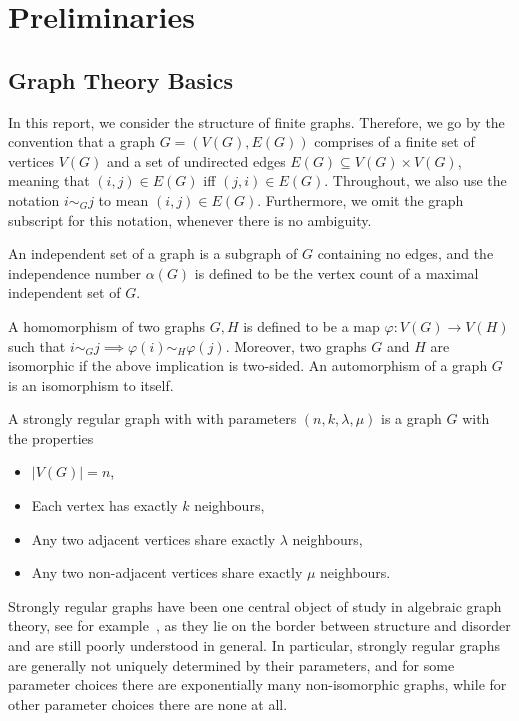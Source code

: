 \section{Preliminaries}

\subsection{Graph Theory Basics}
In this report, we consider the structure of finite graphs.
Therefore, we go by the convention that a graph $G = (V(G), E(G))$ comprises of a
finite set of vertices $V(G)$ and a set of undirected edges $E(G) \subseteq V(G) \times V(G)$,
meaning that $(i, j) \in E(G)$ iff $(j, i) \in E(G)$.
Throughout, we also use the notation $i \sim_G j$ to mean $(i, j) \in E(G)$.
Furthermore, we omit the graph subscript for this notation, whenever there is no ambiguity.

An independent set of a graph is a subgraph of $G$ containing no edges, 
and the independence number $\alpha(G)$ is defined to be the vertex count
of a maximal independent set of $G$.

A homomorphism of two graphs $G, H$ is defined to be a map $\varphi : V(G) \rightarrow V(H)$
such that $i \sim_G j \implies \varphi(i) \sim_H \varphi(j)$.
Moreover, two graphs $G$ and $H$ are isomorphic if the above implication is two-sided.
An automorphism of a graph $G$ is an isomorphism to itself.

A strongly regular graph with with parameters $(n, k, \lambda, \mu)$ is a graph $G$
with the properties
\begin{itemize}
    \item $|V(G)| = n$,
    \item Each vertex has exactly $k$ neighbours,
    \item Any two adjacent vertices share exactly $\lambda$ neighbours,
    \item Any two non-adjacent vertices share exactly $\mu$ neighbours.
\end{itemize}
Strongly regular graphs have been one central object of study in algebraic graph theory, 
see for example~\cite{Brouwer_Van_Maldeghem_2022}, 
as they lie on the border between structure and disorder and are still poorly understood in general.
In particular, strongly regular graphs are generally not uniquely determined by their parameters,
and for some parameter choices there are exponentially many non-isomorphic graphs,
while for other parameter choices there are none at all.

